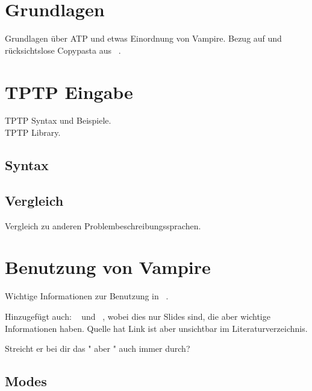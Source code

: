 \documentclass{acm_proc_article-sp-german}
\begin{document}
\section{Grundlagen}
\label{sec:foundations}

Grundlagen über ATP und etwas Einordnung von Vampire. Bezug auf und rücksichtslose Copypasta aus ~\cite{cav2013}.


\section{TPTP Eingabe}
\label{sec:input}

TPTP Syntax und Beispiele.\\
TPTP Library.

\subsection{Syntax}
\label{subsec:syntax}

\subsection{Vergleich}
\label{subsec:tptpcomp}
Vergleich zu anderen Problembeschreibungssprachen.


\section{Benutzung von Vampire}
\label{sec:invocation}

Wichtige Informationen zur Benutzung in ~\cite{hoder2011slides}.

Hinzugefügt auch: ~\cite{kovacs2011slides} und ~\cite{hodervoronkov2012slides}, wobei dies nur Slides sind, die aber wichtige Informationen haben. Quelle hat Link ist aber unsichtbar im Literaturverzeichnis.

Streicht er bei dir das " aber " auch immer durch?

\subsection{Modes}
\label{subsec:modes}
\end{document}
